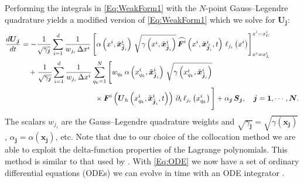 \documentclass[letterpaper]{jpconf}
\renewcommand{\bs}[1]{\boldsymbol{#1}}
\begin{document}
Performing the integrals in \eqref{Eq:WeakForm1} with the $N$-point Gauss--Legendre quadrature yields a modified version of \eqref{Eq:WeakForm1} which we solve for $\bs{U}_{\bs{j}}$:
\begin{align}\label{Eq:ODE}
  \frac{d\bs{U}_{\bs{j}}}{dt}&=-\frac{1}{\sqrt{\gamma_{\bs{j}}}}\sum\limits_{i=1}^{d}\frac{1}{w_{j_{i}}\,\Delta x^{i}}\left[\alpha\left(x^{i},\tilde{\bs{x}}^{i}_{\tilde{\bs{j}}_{i}}\right)\,\sqrt{\gamma\left(x^{i},\tilde{\bs{x}}^{i}_{\tilde{\bs{j}}_{i}}\right)}\,\widehat{\bs{F}^{i}}\left(x^{i},\tilde{\bs{x}}^{i}_{\tilde{\bs{j}_{i}}},t\right)\,\ell_{j_{i}}\left(x^{i}\right)\right]^{x^{i}=x^{i}_{U}}_{x^{i}=x^{i}_{L}}\notag\\
  &\hspace{1em}+\frac{1}{\sqrt{\gamma_{\bs{j}}}}\sum\limits_{i=1}^{d}\frac{1}{w_{j_{i}}\,\Delta x^{i}}\sum\limits_{q_{k}=1}^{N}\Bigg[w_{q_{k}}\,\alpha\left(x^{i}_{q_{k}},\tilde{\bs{x}}^{i}_{\tilde{\bs{j}}_{i}}\right)\,\sqrt{\gamma\left(x^{i}_{q_{k}},\tilde{\bs{x}}^{i}_{\tilde{\bs{j}}_{i}}\right)}\notag\\
  &\hspace{10em}\times\bs{F}^{i}\left(\bs{U}_{h}\left(x^{i}_{q_{k}},\tilde{\bs{x}}^{i}_{\tilde{\bs{j}}_{i}},t\right)\right)\,\partial_{i}\,\ell_{j_{i}}\left(x^{i}_{q_{k}}\right)\Bigg]+\alpha_{\bs{j}}\,\bs{S}_{\bs{j}},\hspace{1em}\bs{j}=\bs{1},\cdots,\bs{N}.
\end{align}
The scalars $w_{j_{i}}$ are the Gauss--Legendre quadrature weights and $\sqrt{\gamma_{\bs{j}}}=\sqrt{\gamma\left(\bs{x_{\bs{j}}}\right)}$, $\alpha_{\bs{j}}=\alpha\left(\bs{x}_{\bs{j}}\right)$, etc. Note that due to our choice of the collocation method we are able to exploit the delta-function properties of the Lagrange polynomials. This method is similar to that used by \cite{Bassi2013}. With \eqref{Eq:ODE} we now have a set of ordinary differential equations (ODEs) we can evolve in time with an ODE integrator \cite{CockburnShu2001}.
\end{document}
